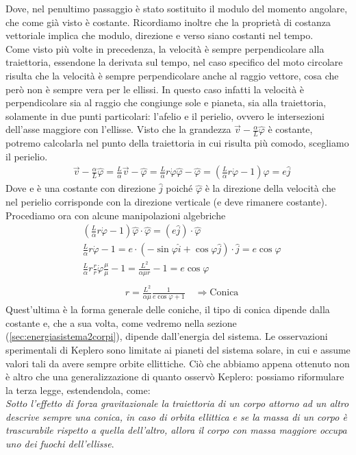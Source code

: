 \documentclass[10pt,a4paper]{article}
\begin{document}
Dove, nel penultimo passaggio è stato sostituito il modulo del momento angolare, che come già visto è costante. Ricordiamo inoltre che la proprietà di costanza vettoriale implica che modulo, direzione e verso siano costanti nel tempo.\\
Come visto più volte in precedenza, la velocità è sempre perpendicolare alla traiettoria, essendone la derivata sul tempo, nel caso specifico del moto circolare risulta che la velocità è sempre perpendicolare anche al raggio vettore, cosa che però non è sempre vera per le ellissi. In questo caso infatti la velocità è perpendicolare sia al raggio che congiunge sole e pianeta, sia alla traiettoria, solamente in due punti particolari: l'afelio e il perielio, ovvero le intersezioni dell'asse maggiore con l'ellisse. Visto che la grandezza $\vec{v}-\frac{\alpha}{L}\hat{\varphi}$ è costante, potremo calcolarla nel punto della traiettoria in cui risulta più comodo, scegliamo il perielio. 
\begin{align*}
	&\vec{v}-\frac{\alpha}{L}\hat{\varphi} = \frac{L}{\alpha}\vec{v}-\hat{\varphi} = \frac{L}{\alpha}r\dot{\varphi} \hat{\varphi}-\hat{\varphi}= (\frac{L}{\alpha}r\dot{\varphi} -1)\hat{\varphi} = e\hat{j}
\end{align*}
Dove e è una costante con direzione $\hat{j}$ poiché $\hat{\varphi}$ è la direzione della velocità che nel perielio corrisponde con la direzione verticale (e deve rimanere costante). Procediamo ora con alcune manipolazioni algebriche
\begin{align*}
&(\frac{L}{\alpha}r\dot{\varphi} -1)\hat{\varphi}\cdot \hat{\varphi} = (e\hat{j})\cdot\hat{\varphi}\\
&\frac{L}{\alpha}r\dot{\varphi} -1 = e \cdot (-\sin\varphi\hat{i}+\cos\varphi\hat{j})\cdot\hat{j}= e \cos\varphi\\
&\frac{L}{\alpha} r \frac{r}{r} \dot{\varphi} \frac{\mu}{\mu} - 1 = \frac{L^2}{\alpha \mu r}-1 = e \cos\varphi\\
\end{align*}
\begin{align}\label{eq:conica}
	&r = \frac{L^2}{\alpha\mu}\frac{1}{e\cos\varphi+1}\quad \Rightarrow \text{Conica}
\end{align}
Quest'ultima è la forma generale delle coniche, il tipo di conica dipende dalla costante e, che a sua volta, come vedremo nella sezione (\ref{sec:energiasistema2corpi}), dipende dall'energia del sistema. Le osservazioni sperimentali di Keplero sono limitate ai pianeti del sistema solare, in cui e assume valori tali da avere sempre orbite ellittiche. Ciò che abbiamo appena ottenuto non è altro che una generalizzazione di quanto osservò Keplero: possiamo riformulare la terza legge, estendendola, come:\\
\textit{Sotto l'effetto di forza gravitazionale la traiettoria di un corpo attorno ad un altro descrive sempre una conica, in caso di orbita ellittica e se la massa di un corpo è trascurabile rispetto a quella dell'altro, allora il corpo con massa maggiore occupa uno dei fuochi dell'ellisse}.
\end{document}
